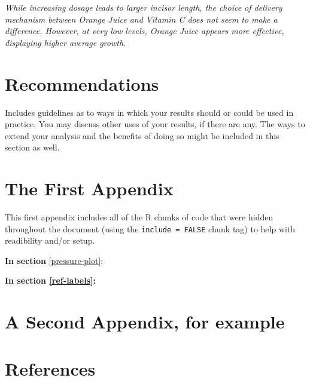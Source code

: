 \documentclass[12pt,oneside]{chicagocapstone}
\begin{document}
\emph{While increasing dosage leads to larger incisor length, the choice of delivery mechanism between Orange Juice and Vitamin C does not seem to make a difference. However, at very low levels, Orange Juice appears more effective, displaying higher average growth.}

\hypertarget{recommendations}{%
\chapter*{Recommendations}\label{recommendations}}

Includes guidelines as to ways in which your results should or could be used in practice. You may discuss other uses of your results, if there are any. The ways to extend your analysis and the benefits of doing so might be included in this section as well.

\appendix

\hypertarget{the-first-appendix}{%
\chapter{The First Appendix}\label{the-first-appendix}}

This first appendix includes all of the R chunks of code that were hidden throughout the document (using the \texttt{include\ =\ FALSE} chunk tag) to help with readibility and/or setup.

\textbf{In section} \ref{pressure-plot}:

\textbf{In section \ref{ref-labels}:}

\hypertarget{a-second-appendix-for-example}{%
\chapter{A Second Appendix, for example}\label{a-second-appendix-for-example}}

\backmatter

\hypertarget{references}{%
\chapter*{References}\label{references}}


\noindent

\setlength{\parindent}{-0.20in}
\setlength{\leftskip}{0.20in}
\setlength{\parskip}{8pt}
\end{document}
